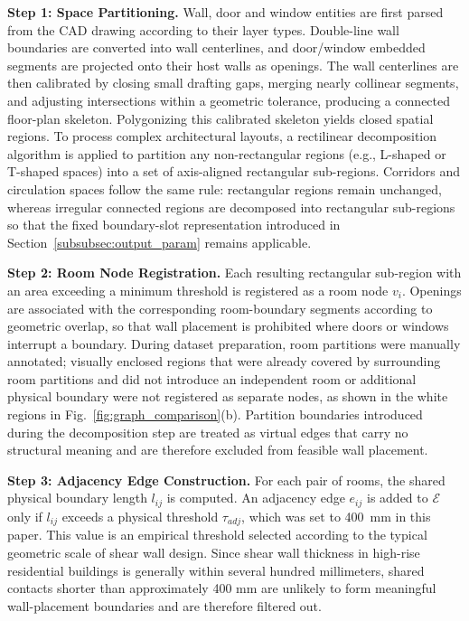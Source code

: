 \textbf{Step 1: Space Partitioning.} Wall, door and window entities are first parsed from the CAD drawing according to their layer types. Double-line wall boundaries are converted into wall centerlines, and door/window embedded segments are projected onto their host walls as openings. The wall centerlines are then calibrated by closing small drafting gaps, merging nearly collinear segments, and adjusting intersections within a geometric tolerance, producing a connected floor-plan skeleton. Polygonizing this calibrated skeleton yields closed spatial regions. To process complex architectural layouts, a rectilinear decomposition algorithm is applied to partition any non-rectangular regions (e.g., L-shaped or T-shaped spaces) into a set of axis-aligned rectangular sub-regions. Corridors and circulation spaces follow the same rule: rectangular regions remain unchanged, whereas irregular connected regions are decomposed into rectangular sub-regions so that the fixed boundary-slot representation introduced in Section~\ref{subsubsec:output_param} remains applicable.

\textbf{Step 2: Room Node Registration.} Each resulting rectangular sub-region with an area exceeding a minimum threshold is registered as a room node $v_i$. Openings are associated with the corresponding room-boundary segments according to geometric overlap, so that wall placement is prohibited where doors or windows interrupt a boundary. During dataset preparation, room partitions were manually annotated; visually enclosed regions that were already covered by surrounding room partitions and did not introduce an independent room or additional physical boundary were not registered as separate nodes, as shown in the white regions in Fig.~\ref{fig:graph_comparison}(b). Partition boundaries introduced during the decomposition step are treated as virtual edges that carry no structural meaning and are therefore excluded from feasible wall placement.

\textbf{Step 3: Adjacency Edge Construction.} For each pair of rooms, the shared physical boundary length $l_{ij}$ is computed. An adjacency edge $e_{ij}$ is added to $\mathcal{E}$ only if $l_{ij}$ exceeds a physical threshold $\tau_{adj}$, which was set to 400~mm in this paper. This value is an empirical threshold selected according to the typical geometric scale of shear wall design. Since shear wall thickness in high-rise residential buildings is generally within several hundred millimeters, shared contacts shorter than approximately 400 mm are unlikely to form meaningful wall-placement boundaries and are therefore filtered out.

